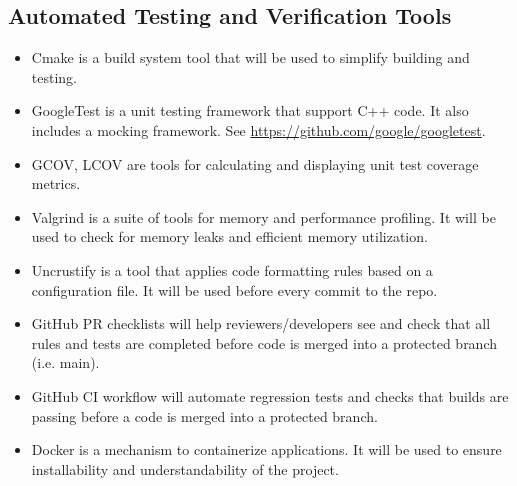 \documentclass[12pt, titlepage]{article}
\begin{document}
\subsection{Automated Testing and Verification Tools}

\begin{itemize}
    \item Cmake \citep{cmake} is a build system tool that will be used to simplify building and
    testing.
    \item GoogleTest is a unit testing framework that support C++ code. It also includes a mocking
    framework. See \url{https://github.com/google/googletest}.
    \item GCOV, LCOV are tools for calculating and displaying unit test coverage metrics.
    \item Valgrind is a suite of tools for memory and performance profiling. It will be used to
    check for memory leaks and efficient memory utilization.
    \item Uncrustify is a tool that applies code formatting rules based on a configuration file. It
    will be used before every commit to the repo.
    \item GitHub PR checklists will help reviewers/developers see and check that all rules and tests
    are completed before code is merged into a protected branch (i.e. main).
    \item GitHub CI workflow will automate regression tests and checks that \progname{} builds are
    passing before a code is merged into a protected branch.
    \item Docker is a mechanism to containerize applications. It will be used to ensure
    installability and understandability of the project.
\end{itemize}



\end{document}

